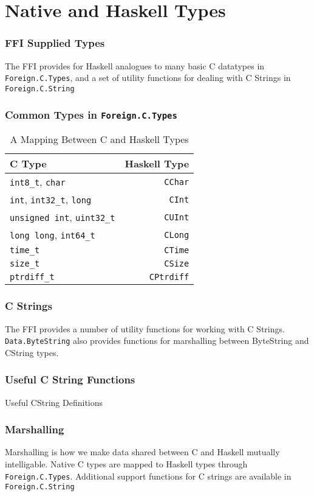 \documentclass{beamer}
\begin{document}
\section{Native and Haskell Types}
\begin{frame}
    \frametitle{FFI Supplied Types}

    The FFI provides for Haskell analogues to many basic C datatypes in {\tt
    Foreign.C.Types}, and a set of utility functions for dealing with C Strings
    in {\tt Foreign.C.String}
\end{frame}
\begin{frame}
    \frametitle{Common Types in {\tt Foreign.C.Types}}
    \begin{table}
        \begin{tabular}{| l | r |}
            \hline
            {\bf C Type} & {\bf Haskell Type} \\ \hline
            {\tt int8\_t}, {\tt char} & {\tt CChar} \\ \hline
            {\tt int}, {\tt int32\_t}, {\tt long}& {\tt CInt} \\ \hline
            {\tt unsigned int}, {\tt uint32\_t} & {\tt CUInt} \\ \hline
            {\tt long long}, {\tt int64\_t} & {\tt CLong} \\ \hline
            {\tt time\_t} & {\tt CTime} \\ \hline
            {\tt size\_t} & {\tt CSize} \\ \hline
            {\tt ptrdiff\_t} & {\tt CPtrdiff} \\ \hline
        \end{tabular}
        \caption{\tiny A Mapping Between C and Haskell Types}
    \end{table}
\end{frame}
\begin{frame}[fragile]
    \frametitle{C Strings}
    The FFI provides a number of utility functions for working with C Strings.
    {\tt Data.ByteString} also provides functions for marshalling between
    ByteString and CString types.
\end{frame}
\begin{frame}
    \frametitle{Useful C String Functions}
    \begin{exampleblock}{Useful CString Definitions}
        
    \end{exampleblock}
\end{frame}
\begin{frame}
    \frametitle{Marshalling}
    Marshalling is how we make data shared between C and Haskell mutually
    intelligable.  Native C types are mapped to Haskell types through
    {\tt Foreign.C.Types}.  Additional support functions for C strings are
    available in {\tt Foreign.C.String}
\end{frame}
\end{document}

